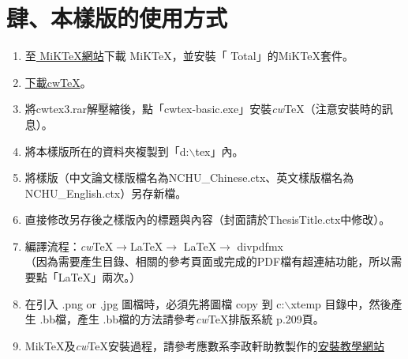 \chapter{肆、本樣版的使用方式}
\cite{bringhurst1996elements,cwtexWu2005}
\begin{enumerate}
    \item 至\href{http://www.miktex.org/}{ MiKTeX網站}下載 MiK\TeX ，並安裝「 Total」的MiK\TeX 套件。
    \item \href{http://www.amath.nchu.edu.tw/~u4815977/cwtex3.rar}{下載cw\TeX}。
    \item 將cwtex3.rar解壓縮後，點「cwtex-basic.exe」安裝\textit{cw}\TeX （注意安裝時的訊息）。
    \item 將本樣版所在的資料夾複製到「d:$\backslash$tex」內。
    \item 將樣版（中文論文樣版檔名為NCHU\_Chinese.ctx、英文樣版檔名為NCHU\_English.ctx）另存新檔。
    \item 直接修改另存後之樣版內的標題與內容（封面請於ThesisTitle.ctx中修改）。
    \item 編譯流程：\textit{cw}\TeX $\rightarrow$\LaTeX $\rightarrow$ \LaTeX $\rightarrow$ divpdfmx\\
        （因為需要產生目錄、相關的參考頁面或完成的PDF檔有超連結功能，所以需要點「\LaTeX 」兩次。）
    \item 在引入 .png or .jpg 圖檔時，必須先將圖檔 copy 到 c:$\backslash$xtemp 目錄中，然後產生 .bb檔，產生 .bb檔的方法請參考\textit{cw}\TeX 排版系統 p.209頁。
    \item Mik\TeX 及\textit{cw}\TeX 安裝過程，請參考應數系李政軒助教製作的\href{http://www.amath.nchu.edu.tw/~u4815977/How_to_Install_cwTeX/How_to_Install_cwTeX.html}{安裝教學網站}
\end{enumerate}
% 